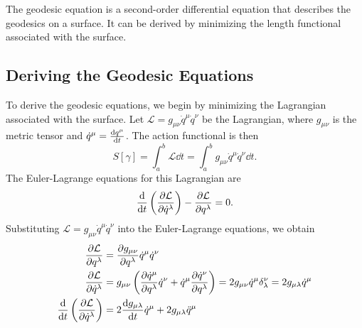 \documentclass[12pt]{article}
\begin{document}
The geodesic equation is a second-order differential equation that describes the geodesics on a surface.
It can be derived by minimizing the length functional associated with the surface.

\subsection{Deriving the Geodesic Equations}

To derive the geodesic equations, we begin by minimizing the Lagrangian associated with the surface.
Let $\mathcal{L} = g_{\mu\nu} \dot{q}^\mu \dot{q}^\nu$ be the Lagrangian, where $g_{\mu\nu}$ is the metric tensor and $\dot{q}^\mu = \dv{q^\mu}{t}$.
The action functional is then
\[
    S[\gamma] = \int_{a}^{b} \mathcal{L} \dd{t} = \int_{a}^{b} g_{\mu\nu} \dot{q}^\mu \dot{q}^\nu \dd{t}.
\]
The Euler-Lagrange equations for this Lagrangian are
\[
    \dv{t} \left( \pdv{\mathcal{L}}{\dot{q}^\lambda} \right) - \pdv{\mathcal{L}}{q^\lambda} = 0.
\]
Substituting $\mathcal{L} = g_{\mu\nu} \dot{q}^\mu \dot{q}^\nu$ into the Euler-Lagrange equations, we obtain
\begin{align*}
    \pdv{\mathcal{L}}{q^{\lambda}} &= \pdv{g_{\mu\nu}}{q^{\lambda}} \dot{q}^{\mu} \dot{q}^{\nu}  \\
    \pdv{\mathcal{L}}{\dot{q}^{\lambda}} &= g_{\mu\nu} \left( \pdv{\dot{q}^{\mu}}{q^{\lambda}} \dot{q}^{\nu} + \dot{q}^{\mu} \pdv{\dot{q}^{\nu}}{q^{\lambda}} \right) = 2 g_{\mu\nu} \dot{q}^{\mu} \delta_{\lambda}^{\nu} = 2 g_{\mu\lambda} \dot{q}^{\mu} \\
    \dv{t} \left( \pdv{\mathcal{L}}{\dot{q}^{\lambda}} \right) &= 2 \dv{g_{\mu\lambda}}{t} \dot{q}^{\mu} + 2 g_{\mu\lambda} \ddot{q}^{\mu} \\
\end{align*}
\end{document}
